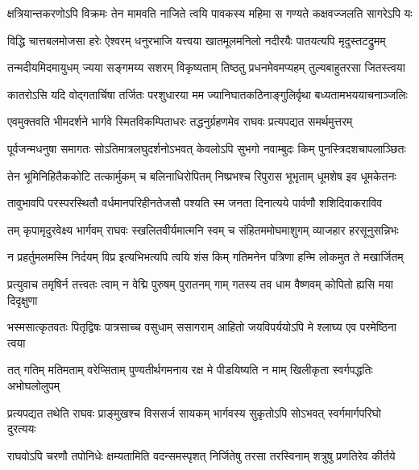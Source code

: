 \fourlineindentedshloka
{क्षत्रियान्तकरणोऽपि विक्रमः}
{तेन मामवति नाजिते त्वयि}
{पावकस्य महिमा स गण्यते}
{कक्षवज्जलति सागरेऽपि यः} %

\fourlineindentedshloka
{विद्धि चात्तबलमोजसा हरेः}
{ऐश्वरम् धनुरभाजि यत्त्वया}
{खातमूलमनिलो नदीरयैः}
{पातयत्यपि मृदुस्तटद्रुमम्} %

\fourlineindentedshloka
{तन्मदीयमिदमायुधम् ज्यया}
{सङ्गमय्य सशरम् विकृष्यताम्}
{तिष्ठतु प्रधनमेवमप्यहम्}
{तुल्यबाहुतरसा जितस्त्वया} %

\fourlineindentedshloka
{कातरोऽसि यदि वोद्गतार्चिषा}
{तर्जितः परशुधारया मम}
{ज्यानिघातकठिनाङ्गुलिर्वृथा}
{बध्यतामभययाचनाञ्जलिः} %

\fourlineindentedshloka
{एवमुक्तवति भीमदर्शने}
{भार्गवे स्मितविकम्पिताधरः}
{तद्धनुर्ग्रहणमेव राघवः}
{प्रत्यपद्यत समर्थमुत्तरम्} %

\fourlineindentedshloka
{पूर्वजन्मधनुषा समागतः}
{सोऽतिमात्रलघुदर्शनोऽभवत्}
{केवलोऽपि सुभगो नवाम्बुदः}
{किम् पुनस्त्रिदशचापलाञ्छितः} %

\fourlineindentedshloka
{तेन भूमिनिहितैककोटि}
{तत्कार्मुकम् च बलिनाधिरोपितम्}
{निष्प्रभश्च रिपुरास भूभृताम्}
{धूमशेष इव धूमकेतनः} %

\fourlineindentedshloka
{तावुभावपि परस्परस्थितौ}
{वर्धमानपरिहीनतेजसौ}
{पश्यति स्म जनता दिनात्यये}
{पार्वणौ शशिदिवाकराविव} %

\fourlineindentedshloka
{तम् कृपामृदुरवेक्ष्य भार्गवम्}
{राघवः स्खलितवीर्यमात्मनि}
{स्वम् च संहितममोघमाशुगम्}
{व्याजहार हरसूनुसन्निभः} %

\fourlineindentedshloka
{न प्रहर्तुमलमस्मि निर्दयम्}
{विप्र इत्यभिभत्यपि त्वयि}
{शंस किम् गतिमनेन पत्रिणा}
{हन्मि लोकमुत ते मखार्जितम्} %

\fourlineindentedshloka
{प्रत्युवाच तमृषिर्न तत्त्वतः}
{त्वाम् न वेद्मि पुरुषम् पुरातनम्}
{गाम् गतस्य तव धाम वैष्णवम्}
{कोपितो ह्यसि मया दिदृक्षुणा} %

\fourlineindentedshloka
{भस्मसात्कृतवतः पितृद्विषः}
{पात्रसाच्च वसुधाम् ससागराम्}
{आहितो जयविपर्ययोऽपि मे}
{श्लाघ्य एव परमेष्ठिना त्वया} %

\fourlineindentedshloka
{तत् गतिम् मतिमताम् वरेप्सिताम्}
{पुण्यतीर्थगमनाय रक्ष मे}
{पीडयिष्यति न माम् खिलीकृता}
{स्वर्गपद्धतिः अभोघलोलुपम्} %

\fourlineindentedshloka
{प्रत्यपद्यत तथेति राघवः}
{प्राङ्मुखश्च विससर्ज सायकम्}
{भार्गवस्य सुकृतोऽपि सोऽभवत्}
{स्वर्गमार्गपरिघो दुरत्ययः} %

\fourlineindentedshloka
{राघवोऽपि चरणौ तपोनिधेः}
{क्षम्यतामिति वदन्समस्पृशत्}
{निर्जितेषु तरसा तरस्विनाम्}
{शत्रुषु प्रणतिरेव कीर्तये} %

